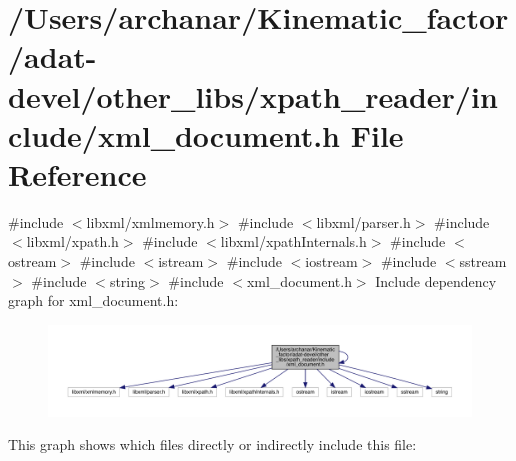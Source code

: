 \hypertarget{adat-devel_2other__libs_2xpath__reader_2include_2xml__document_8h}{}\section{/\+Users/archanar/\+Kinematic\+\_\+factor/adat-\/devel/other\+\_\+libs/xpath\+\_\+reader/include/xml\+\_\+document.h File Reference}
\label{adat-devel_2other__libs_2xpath__reader_2include_2xml__document_8h}
{\ttfamily \#include $<$libxml/xmlmemory.\+h$>$}\newline
{\ttfamily \#include $<$libxml/parser.\+h$>$}\newline
{\ttfamily \#include $<$libxml/xpath.\+h$>$}\newline
{\ttfamily \#include $<$libxml/xpath\+Internals.\+h$>$}\newline
{\ttfamily \#include $<$ostream$>$}\newline
{\ttfamily \#include $<$istream$>$}\newline
{\ttfamily \#include $<$iostream$>$}\newline
{\ttfamily \#include $<$sstream$>$}\newline
{\ttfamily \#include $<$string$>$}\newline
{\ttfamily \#include $<$xml\+\_\+document.\+h$>$}\newline
Include dependency graph for xml\+\_\+document.\+h\+:
\nopagebreak
\begin{figure}[H]
\begin{center}
\leavevmode
\includegraphics[width=350pt]{dc/d9f/adat-devel_2other__libs_2xpath__reader_2include_2xml__document_8h__incl}
\end{center}
\end{figure}
This graph shows which files directly or indirectly include this file\+:
\nopagebreak
